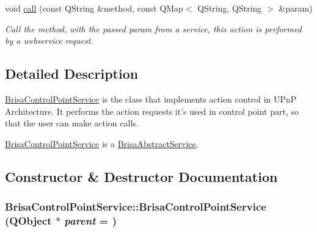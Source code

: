 \begin{DoxyCompactItemize}
void \hyperlink{classBrisaUpnp_1_1BrisaControlPointService_a2ceea746418759667ca7393abbb7a412}{call} (const QString \&method, const QMap$<$ QString, QString $>$ \&param)
\begin{DoxyCompactList}\small\item\em Call the {\itshape method\/}, with the passed {\itshape param\/} from a service, this action is performed by a webservice request. \item\end{DoxyCompactList}\end{DoxyCompactItemize}


\subsection{Detailed Description}
\hyperlink{classBrisaUpnp_1_1BrisaControlPointService}{BrisaControlPointService} is the class that implements action control in UPnP Architecture. It performs the action requests it's used in control point part, so that the user can make action calls.

\hyperlink{classBrisaUpnp_1_1BrisaControlPointService}{BrisaControlPointService} is a \hyperlink{classBrisaUpnp_1_1BrisaAbstractService}{BrisaAbstractService}. 

\subsection{Constructor \& Destructor Documentation}
\hypertarget{classBrisaUpnp_1_1BrisaControlPointService_ae9ca99a1f186d2220cf1f52f2959715d}{
\subsubsection[{BrisaControlPointService}]{\setlength{\rightskip}{0pt plus 5cm}BrisaControlPointService::BrisaControlPointService (QObject $\ast$ {\em parent} = {})}}
\label{classBrisaUpnp_1_1BrisaControlPointService_ae9ca99a1f186d2220cf1f52f2959715d}


